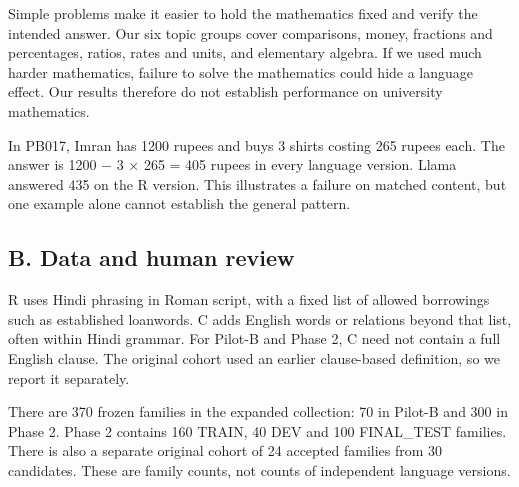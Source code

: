 \medskip{}\par\nopagebreak

Simple problems make it easier to hold the mathematics fixed and verify the intended answer. Our six topic groups cover comparisons, money, fractions and percentages, ratios, rates and units, and elementary algebra. If we used much harder mathematics, failure to solve the mathematics could hide a language effect. Our results therefore do not establish performance on university mathematics.

\medskip{}\par\nopagebreak

In PB017, Imran has 1200 rupees and buys 3 shirts costing 265 rupees each. The answer is 1200 − 3 × 265 = 405 rupees in every language version. Llama answered 435 on the R version. This illustrates a failure on matched content, but one example alone cannot establish the general pattern.

\subsection*{B. Data and human review}


\medskip{}\par\nopagebreak

R uses Hindi phrasing in Roman script, with a fixed list of allowed borrowings such as established loanwords. C adds English words or relations beyond that list, often within Hindi grammar. For Pilot-B and Phase 2, C need not contain a full English clause. The original cohort used an earlier clause-based definition, so we report it separately.

\medskip{}\par\nopagebreak

There are 370 frozen families in the expanded collection: 70 in Pilot-B and 300 in Phase 2. Phase 2 contains 160 TRAIN, 40 DEV and 100 FINAL\_TEST families. There is also a separate original cohort of 24 accepted families from 30 candidates. These are family counts, not counts of independent language versions.

\medskip{}\par\nopagebreak

